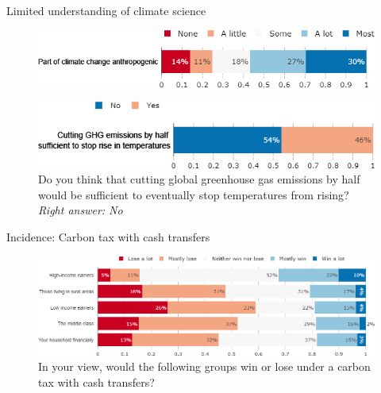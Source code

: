 \begin{framefont}{\small}
\begin{frame}{Limited understanding of climate science}%
	\begin{figure}%
	\centering
	\caption{What part of climate change do you think is due to human activity? \footnotesize{\textit{Right answer: Most}}}
	\includegraphics[width=.7\paperwidth]{../figures/FR/CC_anthropogenic_FR.png} 
	\\
	\caption{Do you think that cutting global greenhouse gas emissions by half would be sufficient to eventually stop temperatures from rising? \footnotesize{\textit{Right answer: No}}}
	\includegraphics[width=.6\paperwidth]{../figures/FR/CC_dynamic_FR.png}
	
	\end{figure}
\end{frame}
	

\begin{frame}{Incidence: Carbon tax with cash transfers}%
	\begin{figure}[h!]
	\centering
	\caption{In your view, would the following groups win or lose under a carbon tax with cash transfers?}
	\includegraphics[width=.87\paperwidth]{../figures/FR/tax_transfers_win_lose_FR.png}
	\end{figure}
\end{frame}


\end{framefont}
